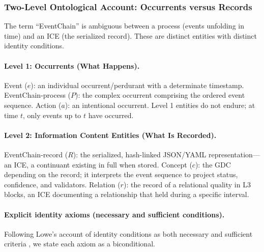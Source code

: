 \subsubsection{Two-Level Ontological Account: Occurrents versus Records}\label{subsec:two-level-account}

The term ``EventChain'' is ambiguous between a process (events unfolding in time) and an ICE (the serialized record). These are distinct entities with distinct identity conditions.

\paragraph{Level 1: Occurrents (What Happens).}
Event ($e$): an individual occurrent/perdurant with a determinate timestamp. EventChain-process ($P$): the complex occurrent comprising the ordered event sequence. Action ($a$): an intentional occurrent. Level 1 entities do not endure; at time $t$, only events up to $t$ have occurred.

\paragraph{Level 2: Information Content Entities (What Is Recorded).}
EventChain-record ($R$): the serialized, hash-linked JSON/YAML representation---an ICE, a continuant existing in full when stored. Concept ($c$): the GDC depending on the record; it interprets the event sequence to project status, confidence, and validators. Relation ($r$): the record of a relational quality in L3 blocks, an ICE documenting a relationship that held during a specific interval.

\paragraph{Explicit identity axioms (necessary and sufficient conditions).}
Following Lowe's account of identity conditions as both necessary and sufficient criteria \cite{lowe1998possibility}, we state each axiom as a biconditional.

